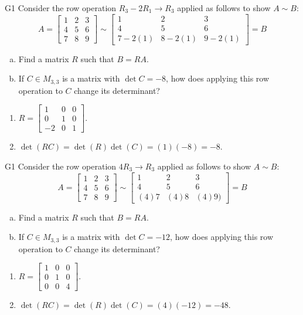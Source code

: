 \begin{problem}{G1}
Consider the row operation \(R_3-2R_1\to R_3\) applied as follows to show
\(A\sim B\):
\[
A=\begin{bmatrix}1&2&3\\4&5&6\\7&8&9\end{bmatrix}
  \sim
\begin{bmatrix}1&2&3\\4&5&6\\7-2(1)&8-2(1)&9-2(1)\end{bmatrix}=B
\]
\begin{enumerate}[(a)]
\item Find a matrix \(R\) such that \(B=RA\).
\item If \(C \in M_{3,3}\) is a matrix with \(\det C = -8\), how does applying this row operation to \(C\) change its determinant?
\end{enumerate}
\end{problem}
\begin{solution}
\begin{enumerate}
\item \(R= \begin{bmatrix} 1 & 0 & 0 \\ 0 & 1 & 0 \\ -2 & 0 & 1 \end{bmatrix}\).
\item \(\det(RC)= \det(R)\det(C)=(1)(-8)=-8\).
\end{enumerate}
\end{solution}

\begin{problem}{G1}
Consider the row operation \(4R_3\to R_3\) applied as follows to show
\(A\sim B\):
\[
A=\begin{bmatrix}1&2&3\\4&5&6\\7&8&9\end{bmatrix}
  \sim
\begin{bmatrix}1&2&3\\4&5&6\\(4)7&(4)8&(4)9)\end{bmatrix}=B
\]
\begin{enumerate}[(a)]
\item Find a matrix \(R\) such that \(B=RA\).
\item If \(C \in M_{3,3}\) is a matrix with \(\det C = -12\), how does applying this row operation to \(C\) change its determinant?
\end{enumerate}
\end{problem}
\begin{solution}
\begin{enumerate}
\item \(R= \begin{bmatrix} 1 & 0 & 0 \\ 0 & 1 & 0 \\ 0 & 0 & 4 \end{bmatrix}\).
\item \(\det(RC)= \det(R)\det(C)=(4)(-12)=-48\).
\end{enumerate}
\end{solution}

